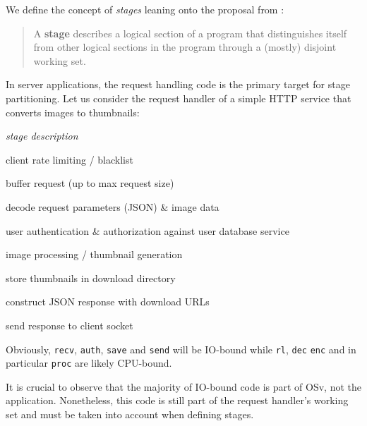 \documentclass{article}
\begin{document}
We define the concept of \textit{stages} leaning onto the proposal from \cite{cohort}:
\begin{quote}
A \textbf{stage} describes a logical section of a program that distinguishes itself from other logical sections in the program
through a (mostly) disjoint working set.
\end{quote}

In server applications, the request handling code is the primary target for stage partitioning.
Let us consider the request handler of a simple HTTP service that converts images to thumbnails:
{
\newcommand{\stage}[1]{\texttt{#1}}
\begin{description}[parsep=0pt,labelwidth=1cm,itemindent=1cm]
    \item[\textit{\stage{stage}}] \textit{stage description}
    \item[\stage{limit}] client rate limiting / blacklist
    \item[\stage{recv}] buffer request (up to max request size) 
    \item[\stage{dec}] decode request parameters (JSON) \& image data
    \item[\stage{auth}] user authentication \& authorization against user database service
    \item[\stage{proc}] image processing / thumbnail generation
    \item[\stage{save}] store thumbnails in download directory
    \item[\stage{enc}] construct JSON response with download URLs
    \item[\stage{send}] send response to client socket
\end{description}
Obviously, \stage{recv}, \stage{auth}, \stage{save} and \stage{send} will be IO-bound
while \stage{rl}, \stage{dec} \stage{enc} and in particular \stage{proc} are likely CPU-bound.

It is crucial to observe that the majority of IO-bound code is part of OSv, not the application.
Nonetheless, this code is still part of the request handler's working set and must be taken into account when defining stages.
}



\end{document}
